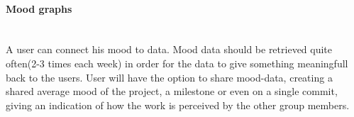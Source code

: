 \paragraph{Mood graphs}\mbox{}\\
A user can connect his mood to data. Mood data should be retrieved quite often(2-3 times each week) in order for the data to give something meaningfull back to the users.
User will have the option to share mood-data, creating a shared average mood of the project, a milestone or even on a single commit, giving an indication of how the work is perceived by the other group members. 
